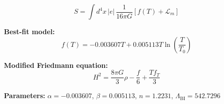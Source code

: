 
\begin{equation}
  S = \int d^4x \, |e| \, \frac{1}{16\pi G} \left[ f(T) + \mathcal{L}_m \right]
\end{equation}

\textbf{Best-fit model:}
\begin{equation}
  f(T) = -0.003607 T + 0.005113 T \ln\!\left(\frac{T}{T_0}\right)
\end{equation}

\textbf{Modified Friedmann equation:}
\begin{equation}
  H^2 = \frac{8\pi G}{3} \rho - \frac{f}{6} + \frac{T f_T}{3}
\end{equation}

\textbf{Parameters:}
$\alpha = -0.003607$, \quad
$\beta = 0.005113$, \quad
$n = 1.2231$, \quad
$\Lambda_{\text{BI}} = 542.7296$